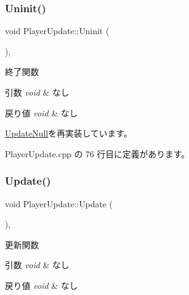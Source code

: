 \subsubsection{\texorpdfstring{Uninit()}{Uninit()}}
{\footnotesize\ttfamily void Player\+Update\+::\+Uninit (\begin{DoxyParamCaption}{ }\end{DoxyParamCaption})\hspace{0.3cm}{\ttfamily [override]}, {\ttfamily [virtual]}}



終了関数 


\begin{DoxyParams}{引数}
{\em void} & なし \\
\hline
\end{DoxyParams}

\begin{DoxyRetVals}{戻り値}
{\em void} & なし \\
\hline
\end{DoxyRetVals}


\mbox{\hyperlink{class_update_null_a820189d686ec62f7a30d547118c419df}{Update\+Null}}を再実装しています。



 Player\+Update.\+cpp の 76 行目に定義があります。

\mbox{\label{class_player_update_af6e1b8ca60399f232e64d2acb4968c75}} 
\subsubsection{\texorpdfstring{Update()}{Update()}}
{\footnotesize\ttfamily void Player\+Update\+::\+Update (\begin{DoxyParamCaption}{ }\end{DoxyParamCaption})\hspace{0.3cm}{\ttfamily [override]}, {\ttfamily [virtual]}}



更新関数 


\begin{DoxyParams}{引数}
{\em void} & なし \\
\hline
\end{DoxyParams}

\begin{DoxyRetVals}{戻り値}
{\em void} & なし \\
\hline
\end{DoxyRetVals}


